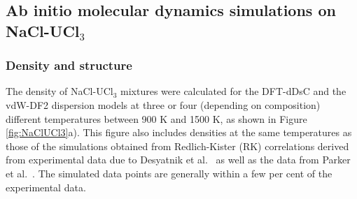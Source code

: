 \documentclass[preprint,3p,10pt,onecolumn,number,sort&compress]{elsarticle}
\begin{document}
{%




\FloatBarrier

\subsection{Ab initio molecular dynamics simulations on NaCl-UCl$_3$}
\subsubsection{Density and structure}
The density of NaCl-UCl$_3$ mixtures were calculated for the DFT-dDsC and the vdW-DF2 dispersion models at three or four (depending on composition) different temperatures between 900 K and 1500 K, as shown in Figure \ref{fig:NaClUCl3}a). This figure also includes densities at the same temperatures as those of the simulations obtained from Redlich-Kister (RK) correlations \cite{agca2022} derived from experimental data due to Desyatnik et al.~\cite{Desyatnik} as well as the data from Parker et al.~\cite{Parker}. The simulated data points are generally within a few per cent of the experimental data. 

}
\end{document}
